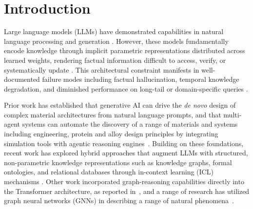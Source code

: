 \documentclass{article}
\begin{document}
\section{Introduction}
Large language models (LLMs) have demonstrated capabilities in natural language processing and generation \cite{vaswani2023attentionneed, JMLR:v21:20-074, devlin-etal-2019-bert, chowdhery2022palmscalinglanguagemodeling}. However, these models fundamentally encode knowledge through implicit parametric representations distributed across learned weights, rendering factual information difficult to access, verify, or systematically update \cite{petroni-etal-2019-language, roberts-etal-2020-much, meng2023locatingeditingfactualassociations, 10.1145/3627673.3679673, gekhman2025insideouthiddenfactualknowledge, mousavi2025llmsrepositoriesfactualknowledge, mallen2023trustlanguagemodelsinvestigating, modarressi2025memllmfinetuningllmsuse, thede2025wikibigeditunderstandinglimitslifelong,Buehler2024}. This architectural constraint manifests in well-documented failure modes including factual hallucination, temporal knowledge degradation, and diminished performance on long-tail or domain-specific queries \cite{10.1145/3703155, maynez-etal-2020-faithfulness, brown2020languagemodelsfewshotlearners, jiang2020knowlanguagemodelsknow}. 

Prior work has established that generative AI can drive the \textit{de novo }design of complex material architectures from natural language prompts, and that multi-agent systems can automate the discovery of a range of materials and systems including engineering, protein and alloy design principles by integrating simulation tools with agentic reasoning engines~\cite{D4DD00013G,Lu2025FineTuningLLMs,ghafarollahi2025sparksmultiagentartificialintelligence,RN31,Ghafarollahi_Buehler_2025,Buehler2025GPReFLexOR}. Building on these foundations, recent work has explored hybrid approaches that augment LLMs with structured, non-parametric knowledge representations such as knowledge graphs, formal ontologies, and relational databases through in-context learning (ICL) mechanisms \cite{Hu2023,Buehler2024, Ghafarollahi2024, jiang-etal-2023-structgpt, hao2022structuredpromptingscalingincontext, lee2024learningreduceoptimalrepresentations, waghmare2025efficientgraphunderstandingllms}. Other work incorporated graph-reasoning capabilities directly into the Transformer architecture, as reported in~\cite{Buehler2025GA}, and a range of research has utilized graph neural networks (GNNs) in describing a range of natural phenomena~\cite{Reiser2022,Zhou2020,Yang2025MultiCell}. 
\end{document}
